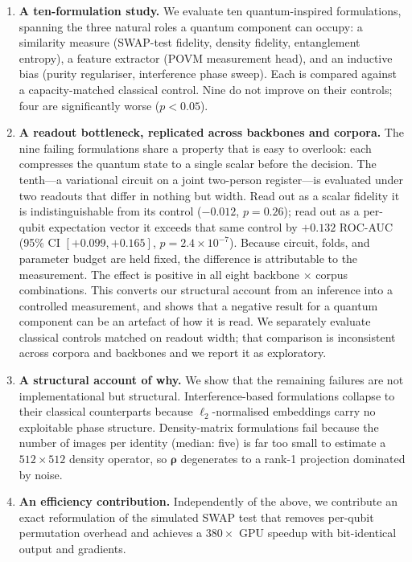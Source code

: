 \documentclass[preprint,12pt]{elsarticle}
\begin{document}
\begin{enumerate}
\item \textbf{A ten-formulation study.} We evaluate ten
quantum-inspired formulations, spanning the three natural roles a quantum
component can occupy: a similarity measure (SWAP-test fidelity, density
fidelity, entanglement entropy), a feature extractor (POVM measurement head),
and an inductive bias (purity regulariser, interference phase sweep). Each
is compared against a capacity-matched classical control. Nine do not improve
on their controls; four are significantly worse ($p < 0.05$).

\item \textbf{A readout bottleneck, replicated across backbones and corpora.}
The nine failing formulations share a property that is easy to overlook:
each compresses the quantum state to a single scalar before the decision.
The tenth---a variational circuit on a joint two-person register---is
evaluated under two readouts that differ in nothing but width. Read out as a
scalar fidelity it is indistinguishable from its control
($-0.012$, $p = 0.26$); read out as a per-qubit expectation vector it exceeds
that same control by $+0.132$ ROC-AUC
(95\% CI $[+0.099, +0.165]$, $p = 2.4 \times 10^{-7}$).
Because circuit, folds, and parameter budget are held fixed, the difference is
attributable to the measurement. The effect is positive in all eight
backbone $\times$ corpus combinations. This converts our structural account
from an inference into a controlled measurement, and shows that a negative
result for a quantum component can be an artefact of how it is read. We
separately evaluate classical controls matched on readout width; that
comparison is inconsistent across corpora and backbones and we report it as
exploratory.

\item \textbf{A structural account of why.} We show that the remaining
failures are not implementational but structural. Interference-based formulations collapse
to their classical counterparts because $\ell_2$-normalised embeddings carry
no exploitable phase structure. Density-matrix formulations fail because the
number of images per identity (median: five) is far too small to estimate a
$512 \times 512$ density operator, so $\bm{\rho}$ degenerates to a rank-1
projection dominated by noise.

\item \textbf{An efficiency contribution.} Independently of the above, we
contribute an exact reformulation of the simulated SWAP test that removes
per-qubit permutation overhead and achieves a $380\times$ GPU speedup with
bit-identical output and gradients.
\end{enumerate}
\end{document}
